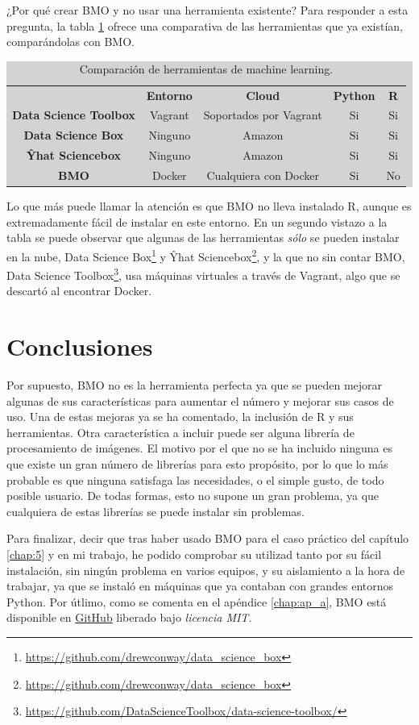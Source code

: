 ¿Por qué crear BMO y no usar una herramienta existente? Para responder a esta pregunta, la tabla \ref{table:4.1} ofrece una comparativa de las herramientas que ya existían, comparándolas con BMO.

\begin{table}[H]
\begin{adjustwidth}{-20mm}{-20mm}
\centering
\colorbox{lightgray}{\begin{tabular}{*{5}{c}}
  & \textbf{Entorno} & \textbf{Cloud} & \textbf{Python} & \textbf{R} \\
  \textbf{Data Science Toolbox} & Vagrant & Soportados por Vagrant & Si & Si \\
  \textbf{Data Science Box} & Ninguno & Amazon & Si & Si \\
  \textbf{Ŷhat Sciencebox} & Ninguno & Amazon & Si & Si \\
  \textbf{BMO} & Docker & Cualquiera con Docker & Si & No
\end{tabular}}
\caption{Comparación de herramientas de machine learning.}
\label{table:4.1}
\end{adjustwidth}
\end{table}

Lo que más puede llamar la atención es que BMO no lleva instalado R, aunque es extremadamente fácil de instalar en este entorno. En un segundo vistazo a la tabla se puede observar que algunas de las herramientas \emph{sólo} se pueden instalar en la nube, Data Science Box\footnote{\url{https://github.com/drewconway/data_science_box}} y Ŷhat Sciencebox\footnote{\url{https://github.com/drewconway/data_science_box}}, y la que no sin contar BMO, Data Science Toolbox\footnote{\url{https://github.com/DataScienceToolbox/data-science-toolbox/}}, usa máquinas virtuales a través de Vagrant, algo que se descartó al encontrar Docker.

\section{Conclusiones} \label{sec:4.6}

Por supuesto, BMO no es la herramienta perfecta ya que se pueden mejorar algunas de sus características para aumentar el número y mejorar sus casos de uso. Una de estas mejoras ya se ha comentado, la inclusión de R y sus herramientas. Otra característica a incluir puede ser alguna librería de procesamiento de imágenes. El motivo por el que no se ha incluido ninguna es que existe un gran número de librerías para esto propósito, por lo que lo más probable es que ninguna satisfaga las necesidades, o el simple gusto, de todo posible usuario. De todas formas, esto no supone un gran problema, ya que cualquiera de estas librerías se puede instalar sin problemas.

Para finalizar, decir que tras haber usado BMO para el caso práctico del capítulo \ref{chap:5} y en mi trabajo, he podido comprobar su utilizad tanto por su fácil instalación, sin ningún problema en varios equipos, y su aislamiento a la hora de trabajar, ya que se instaló en máquinas que ya contaban con grandes entornos Python. Por útlimo, como se comenta en el apéndice \ref{chap:ap_a}, BMO está disponible en \href{https://github.com/josemazo/bmo}{GitHub} liberado bajo \emph{licencia MIT}.
